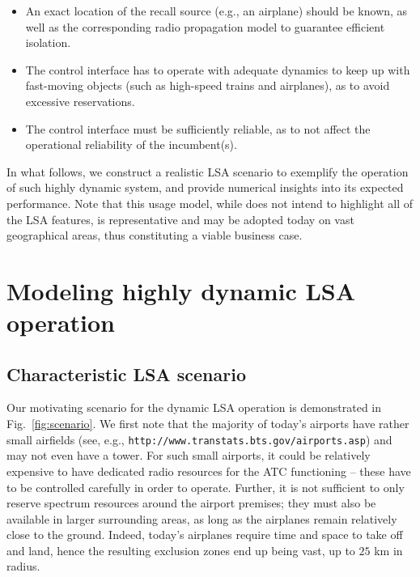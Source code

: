 \documentclass[journal]{IEEEtran}
\begin{document}
\begin{itemize}
	\item An exact location of the recall source (e.g., an airplane) should be known, as well as the corresponding radio propagation model to guarantee efficient isolation.
	\item The control interface has to operate with adequate dynamics to keep up with fast-moving objects (such as high-speed trains and airplanes), as to avoid excessive reservations.
	\item The control interface must be sufficiently reliable, as to not affect the operational reliability of the incumbent(s).
\end{itemize}

In what follows, we construct a realistic LSA scenario to exemplify the operation of such highly dynamic system, and provide numerical insights into its expected performance. Note that this usage model, while does not intend to highlight all of the LSA features, is representative and may be adopted today on vast geographical areas, thus constituting a viable business case.



\section{Modeling highly dynamic LSA operation}

\subsection{Characteristic LSA scenario}

Our motivating scenario for the dynamic LSA operation is demonstrated in Fig.~\ref{fig:scenario}. We first note that the majority of today's airports have rather small airfields (see, e.g., \verb+http://www.transtats.bts.gov/airports.asp+) and may not even have a tower. For such small airports, it could be relatively expensive to have dedicated radio resources for the ATC functioning -- these have to be controlled carefully in order to operate. Further, it is not sufficient to only reserve spectrum resources around the airport premises; they must also be available in larger surrounding areas, as long as the airplanes remain relatively close to the ground. Indeed, today's airplanes require time and space to take off and land, hence the resulting exclusion zones end up being vast, up to $25$ km in radius.
\end{document}
